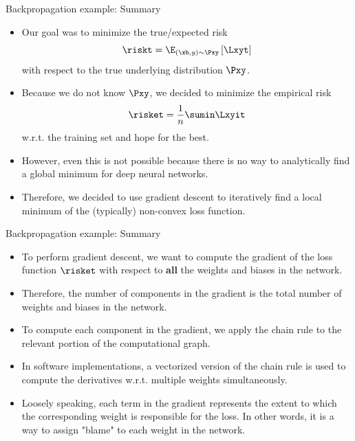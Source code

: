 \begin{frame} {Backpropagation example: Summary}
  \begin{itemize}
    \item Our goal was to minimize the true/expected risk $$\riskt = \E_{(\xb, y)\sim \Pxy} \left[\Lxyt\right]$$
    with respect to the true underlying distribution $\Pxy$.
    \item Because we do not know $\Pxy$, we decided to minimize the empirical risk $$\risket = \frac{1}{n} \sumin \Lxyit$$ w.r.t. the training set and hope for the best.
    \item However, even this is not possible because there is no way to analytically find a global minimum for deep neural networks.
    \item Therefore, we decided to use gradient descent to iteratively find a local minimum of the (typically) non-convex loss function.
  \end{itemize}
\end{frame}

\begin{frame} {Backpropagation example: Summary}
  \begin{itemize}
      \item To perform gradient descent, we want to compute the gradient of the loss function $\risket$ with respect to \textbf{all} the weights and biases in the network.
      \item Therefore, the number of components in the gradient is the total number of weights and biases in the network.
      \item To compute each component in the gradient, we apply the chain rule to the relevant portion of the computational graph.
      \item In software implementations, a vectorized version of the chain rule is used to compute the derivatives w.r.t. multiple weights simultaneously.
      \item Loosely speaking, each term in the gradient represents the extent to which the corresponding weight is responsible for the loss. In other words, it is a way to assign "blame" to each weight in the network.
  \end{itemize}
\end{frame}


